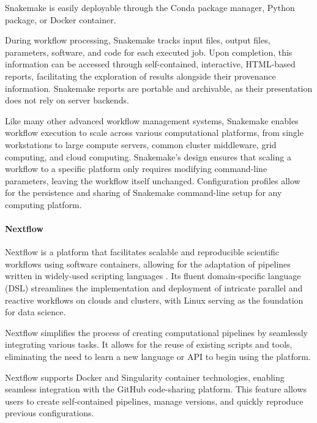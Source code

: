                 Snakemake is easily deployable through the Conda package manager, Python package, or Docker container.
          
                During workflow processing, Snakemake tracks input files, output files, parameters, software, and code for each executed job. Upon completion, this information can be accessed through self-contained, interactive, HTML-based reports, facilitating the exploration of results alongside their provenance information. Snakemake reports are portable and archivable, as their presentation does not rely on server backends.
        
                Like many other advanced workflow management systems, Snakemake enables workflow execution to scale across various computational platforms, from single workstations to large compute servers, common cluster middleware, grid computing, and cloud computing. Snakemake's design ensures that scaling a workflow to a specific platform only requires modifying command-line parameters, leaving the workflow itself unchanged. Configuration profiles allow for the persistence and sharing of Snakemake command-line setup for any computing platform.
                
            \paragraph*{Nextflow}
                Nextflow is a platform that facilitates scalable and reproducible scientific workflows using software containers, allowing for the adaptation of pipelines written in widely-used scripting languages \cite{di2017nextflow}. Its fluent domain-specific language (DSL) streamlines the implementation and deployment of intricate parallel and reactive workflows on clouds and clusters, with Linux serving as the foundation for data science.
                
                Nextflow simplifies the process of creating computational pipelines by seamlessly integrating various tasks. It allows for the reuse of existing scripts and tools, eliminating the need to learn a new language or API to begin using the platform.
                
                Nextflow supports Docker and Singularity container technologies, enabling seamless integration with the GitHub code-sharing platform. This feature allows users to create self-contained pipelines, manage versions, and quickly reproduce previous configurations.
                
